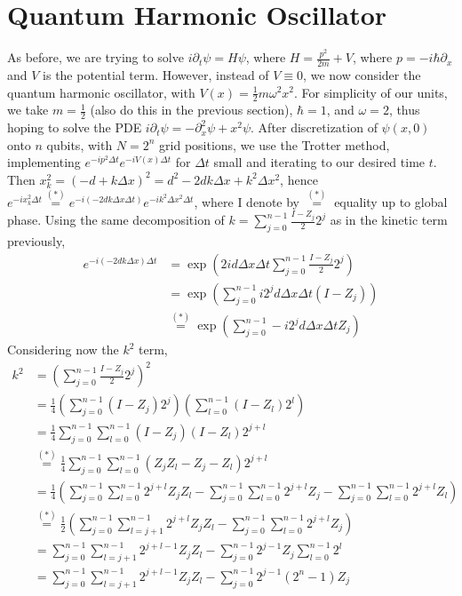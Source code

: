 \documentclass[10pt]{article}
\begin{document}
\section*{Quantum Harmonic Oscillator}
As before, we are trying to solve $i \partial_t \psi = H \psi$, where
$H = \frac{p^2}{2m} + V$, where $p = -i \hbar \partial_x$ and $V$ is the
potential term. However, instead of $V \equiv 0$, we now consider the quantum
harmonic oscillator, with $V(x) = \frac{1}{2} m \omega^2 x^2$. For simplicity
of our units, we take $m = \frac{1}{2}$ (also do this in the previous section), $\hbar = 1$, and $\omega = 2$, thus hoping to solve
the PDE $i \partial_t \psi = -\partial_x^2 \psi + x^2 \psi$. After discretization 
of $\psi(x, 0)$ onto $n$ qubits, with $N = 2^n$ grid positions, we use the Trotter method, implementing $e^{-i p^2 \Delta t}
e^{-i V(x) \Delta t}$ for $\Delta t$ small and iterating to our desired time $t$.
Then $x_k^2 = (-d + k \Delta x)^2 = d^2 - 2d k \Delta x + k^2 \Delta x^2$, hence
$e^{-i x_k^2 \Delta t} \overset{(*)}{=} e^{-i(-2d k \Delta x \Delta t)} e^{-i k^2 \Delta x^2 \Delta t}$, where I
denote by $\overset{(*)}{=}$ equality up to global phase. Using the same decomposition
of $k = \sum_{j=0}^{n-1} \frac{I - Z_j}{2} 2^j$ as in the kinetic term previously,
\begin{align*}
e^{-i(-2dk \Delta x) \Delta t} &= \exp \left(2id \Delta x \Delta t \sum_{j=0}^{n-1}\frac{I-Z_j}{2} 2^j \right) \\
&= \exp \left(\sum_{j=0}^{n-1} i 2^j d \Delta x \Delta t(I-Z_j)\right) \\
&\overset{(*)}{=} \exp \left(\sum_{j=0}^{n-1} -i 2^j d \Delta x \Delta t Z_j \right)
\end{align*}
Considering now the $k^2$ term,
\begin{align*}
    k^2 &= \left(\sum_{j=0}^{n-1}\frac{I - Z_j}{2} 2^j \right)^2 \\
    &= \frac{1}{4} \left(\sum_{j=0}^{n-1} (I - Z_j)2^j \right) \left( \sum_{l=0}^{n-1} (I - Z_l)2^l \right) \\
    &= \frac{1}{4} \sum_{j=0}^{n-1} \sum_{l=0}^{n-1} (I-Z_j)(I-Z_l)2^{j+l} \\
    &\overset{(*)}{=} \frac{1}{4} \sum_{j=0}^{n-1} \sum_{l=0}^{n-1} (Z_j Z_l - Z_j - Z_l)2^{j+l} \\
    &= \frac{1}{4}\left( \sum_{j=0}^{n-1} \sum_{l=0}^{n-1} 2^{j+l} Z_j Z_l - \sum_{j=0}^{n-1} \sum_{l=0}^{n-1} 2^{j+l} Z_j 
    - \sum_{j=0}^{n-1} \sum_{l=0}^{n-1} 2^{j+l} Z_l \right) \\
    &\overset{(*)}{=} \frac{1}{2} \left( \sum_{j=0}^{n-1} \sum_{l=j+1}^{n-1} 2^{j+l} Z_j Z_l 
    - \sum_{j=0}^{n-1} \sum_{l=0}^{n-1} 2^{j+l} Z_j \right) \\
    &= \sum_{j=0}^{n-1} \sum_{l=j+1}^{n-1} 2^{j+l-1} Z_j Z_l - \sum_{j=0}^{n-1} 2^{j-1}Z_j\sum_{l=0}^{n-1} 2^l \\
    &= \sum_{j=0}^{n-1} \sum_{l=j+1}^{n-1} 2^{j+l-1} Z_j Z_l - \sum_{j=0}^{n-1} 2^{j-1}(2^n - 1)Z_j
\end{align*}
\end{document}
